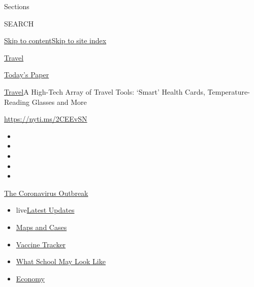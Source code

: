 Sections

SEARCH

\protect\hyperlink{site-content}{Skip to
content}\protect\hyperlink{site-index}{Skip to site index}

\href{https://www.nytimes3xbfgragh.onion/section/travel}{Travel}

\href{https://myaccount.nytimes3xbfgragh.onion/auth/login?response_type=cookie\&client_id=vi}{}

\href{https://www.nytimes3xbfgragh.onion/section/todayspaper}{Today's
Paper}

\href{/section/travel}{Travel}\textbar{}A High-Tech Array of Travel
Tools: `Smart' Health Cards, Temperature-Reading Glasses and More

\url{https://nyti.ms/2CEEvSN}

\begin{itemize}
\item
\item
\item
\item
\item
\end{itemize}

\href{https://www.nytimes3xbfgragh.onion/news-event/coronavirus?action=click\&pgtype=Article\&state=default\&region=TOP_BANNER\&context=storylines_menu}{The
Coronavirus Outbreak}

\begin{itemize}
\tightlist
\item
  live\href{https://www.nytimes3xbfgragh.onion/2020/08/01/world/coronavirus-covid-19.html?action=click\&pgtype=Article\&state=default\&region=TOP_BANNER\&context=storylines_menu}{Latest
  Updates}
\item
  \href{https://www.nytimes3xbfgragh.onion/interactive/2020/us/coronavirus-us-cases.html?action=click\&pgtype=Article\&state=default\&region=TOP_BANNER\&context=storylines_menu}{Maps
  and Cases}
\item
  \href{https://www.nytimes3xbfgragh.onion/interactive/2020/science/coronavirus-vaccine-tracker.html?action=click\&pgtype=Article\&state=default\&region=TOP_BANNER\&context=storylines_menu}{Vaccine
  Tracker}
\item
  \href{https://www.nytimes3xbfgragh.onion/interactive/2020/07/29/us/schools-reopening-coronavirus.html?action=click\&pgtype=Article\&state=default\&region=TOP_BANNER\&context=storylines_menu}{What
  School May Look Like}
\item
  \href{https://www.nytimes3xbfgragh.onion/live/2020/07/31/business/stock-market-today-coronavirus?action=click\&pgtype=Article\&state=default\&region=TOP_BANNER\&context=storylines_menu}{Economy}
\end{itemize}

